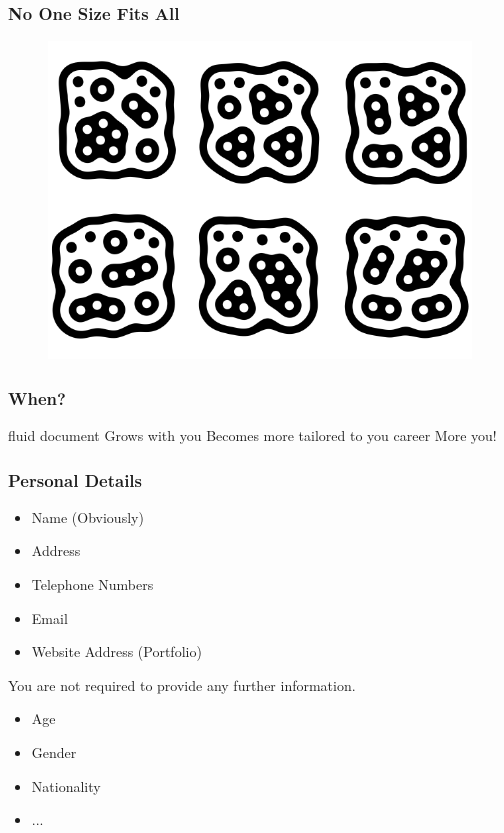 \begin{frame}
	\frametitle{No One Size Fits All}
	\begin{figure}
		\includegraphics[scale=.5]{assets/reactivision}
	\end{figure}
\end{frame}



\begin{frame}
	\frametitle{When?}
	\pause fluid document
	\pause Grows with you
	\pause Becomes more tailored to you career 
	\pause More you! 
	
\end{frame}


\begin{frame}
	\frametitle{Personal Details}
	
	\begin{itemize}
		\item Name (Obviously)
		\item Address
		\item Telephone Numbers
		\item Email
		\item Website Address (Portfolio)
	\end{itemize}

	\pause
	You are not required to provide any further information. 
	\begin{itemize}
		\item Age
		\item Gender
		\item Nationality
		\item ... 
	\end{itemize}

\end{frame}

